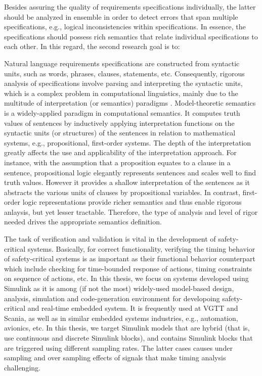 Besides assuring the quality of requirements specifications individually, the latter should be analyzed in ensemble in order to detect errors that span multiple specifications, e.g., logical inconsistencies within specifications. In essence, the specifications should possess rich semantics that relate individual specifications to each other. In this regard, the second research goal is to:

\begin{researchgoal}
\end{researchgoal}

Natural language requirements specifications are constructed from syntactic units, such as words, phrases, clauses, statements, etc. Consequently, rigorous analysis of specifications involve parsing and interpreting the syntactic units, which is a complex problem in computational linguistics, mainly due to the multitude of  interpretation (or semantics) paradigms \cite{Clark2010TheProcessing}. Model-theoretic semantics is a widely-applied paradigm in computational semantics. It computes truth values of sentences by inductively applying interpretation functions on the syntactic units (or structures) of the sentences in relation to mathematical systems, e.g., propositional, first-order systems. The depth of the interpretation greatly affects the use and applicability of the interpretation approach. For instance, with the assumption that a proposition equates to a clause in a sentence, propositional logic elegantly represents sentences and scales well to find truth values. However it provides a shallow interpretation of the sentences as it abstracts the various units of clauses by propositional variables. In contrast, first-order logic representations provide richer semantics and thus enable rigorous anlaysis, but yet lesser tractable. Therefore, the type of analysis and level of rigor needed drives the appropriate semantics definition.

The task of verification and validation is vital in the development of safety-critical systems. Basically, for correct functionality, verifying the timing behavior of safety-critical systems is as important as their functional behavior counterpart which include checking for time-bounded response of actions, timing constraints on sequence of actions, etc. In this thesis, we focus on systems developed using Simulink as it is among (if not the most) widely-used model-based design, analysis, simulation and code-generation environment for developoing safety-critical and real-time embedded system. It is frequently used at VGTT and Scania, as well as in similar embedded systems industries, e.g., automation, avionics, etc. In this thesis, we target Simulink models that are hybrid (that is, use continuous and discrete Simulink blocks), and contains Simulink blocks that are triggered using different sampling rates. The latter cases causes under sampling and over sampling effects of signals that make timing analysis challenging.

